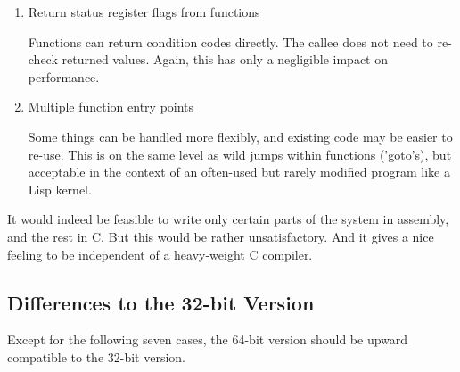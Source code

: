 \begin{enumerate}
\item  Return status register flags from functions

      Functions can return condition codes directly. The callee does not need to
      re-check returned values. Again, this has only a negligible impact on
      performance.

\item  Multiple function entry points

      Some things can be handled more flexibly, and existing code may be easier
      to re-use. This is on the same level as wild jumps within functions
      ('goto's), but acceptable in the context of an often-used but rarely
      modified program like a Lisp kernel.

\end{enumerate}



It would indeed be feasible to write only certain parts of the system in
assembly, and the rest in C. But this would be rather unsatisfactory. And it
gives a nice feeling to be independent of a heavy-weight C compiler.


\subsection{Differences to the 32-bit Version}
\label{sec:64-bit-differences-to-the-32-bit-version}

Except for the following seven cases, the 64-bit version should be upward
compatible to the 32-bit version.

